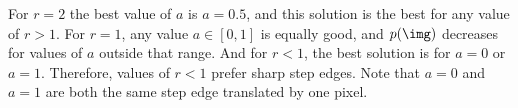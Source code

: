 For $r=2$ the best value of $a$ is $a=0.5$, and this solution is the best for any value of $r>1$. For $r=1$, any value $a \in \left[0,1\right]$ is equally good, and $p(\img)$ decreases for values of $a$ outside that range. And for $r<1$, the best solution is for $a=0$ or $a=1$. Therefore, values of $r<1$ prefer sharp step edges. Note that $a=0$ and $a=1$ are both the same step edge translated by one pixel.

%
%
%
%
%
%
%
%
%
%
